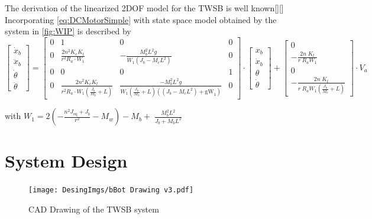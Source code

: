     The derivation of the linearized 2DOF model for the TWSB is well known[][] Incorporating \ref{eq:DCMotorSimple}
    with state space model obtained by \cite{Velazquez2016VelocityAM} the system in \ref{fig:WIP} is described by 
    \begin{equation}
        \left\lbrack \begin{array}{c}
        {\dot{x} }_b \\
        {\ddot{x} }_b \\
        \dot{\theta} \\
        \ddot{\theta} 
        \end{array}\right\rbrack =\left\lbrack \begin{array}{cccc}
        0 & 1 & 0 & 0\\
        0 & \frac{2n^2 K_e K_t }{r^2 R_a \cdot W_1 } & -\frac{M_b^2 L^2 g\;}{W_1 \left(J_b -M_c L^2 \right)} & 0\\
        0 & 0 & 0 & 1\\
        0 & \frac{2n^2 K_e K_t }{r^2 R_a \cdot W_1 \left(\frac{J_b }{M_b }+L\right)} & \frac{{-M}_b^2 L^2 g}{W_1 \left(\frac{J_b }{M_b }+L\right)\left(\left(J_b -M_c L^2 \right)+{\mathrm{gW}}_1 \right)} & 0
        \end{array}\right\rbrack \cdot \left\lbrack \begin{array}{c}
        x_b \\
        {\dot{x} }_b \\
        \theta \\
        \dot{\theta} 
        \end{array}\right\rbrack +\left\lbrack \begin{array}{c}
        0\\
        -\frac{2{n\;K}_t }{r\;R_a W_1 }\\
        0\\
        -\frac{2n\;K_t }{r\;R_a W_1 \left(\frac{J_b }{M_b }+L\right)}
        \end{array}\right\rbrack \cdot V_a
    \end{equation} 

    with $W_1 =2\left(-\frac{n^2 J_{\mathrm{eq}} +J_b }{r^2 }-M_w \right)-M_b +\;\frac{M_b^2 L^2 }{J_b +M_b L^2 }$ 

    \pagebreak{}

    \section{System Design}
        \begin{figure}[H]
            \texttt{[image: DesingImgs/bBot Drawing v3.pdf]}
            \caption{CAD Drawing of the TWSB system}
            \label{fig:CAD}
        \end{figure}

